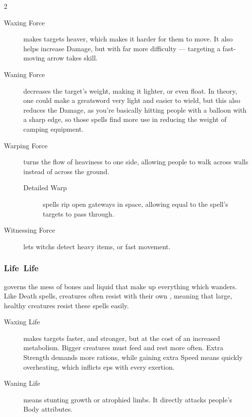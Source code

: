 \begin{multicols}{2}
\begin{description}
  \item[Waxing Force]
  makes targets heaver, which makes it harder for them to move.
  It also helps increase Damage, but with far more difficulty --- targeting a fast-moving arrow takes skill.

  \item[Waning Force]
  decreases the target's \gls{weight}, making it lighter, or even float.
  In theory, one could make a greatsword very light and easier to wield, but this also reduces the Damage, as you're basically hitting people with a balloon with a sharp edge, so those \glspl{spell} find more use in reducing the \gls{weight} of camping equipment.

  \item[Warping Force]
  turns the flow of heaviness to one side, allowing people to walk across walls instead of across the ground.

  \begin{description}
    \item[Detailed Warp]
    \glspl{spell} rip open gateways in space, allowing  equal to the \gls{spell}'s targets to pass through.
  \end{description}

  \item[Witnessing Force]
  lets \glspl{witch} detect heavy items, or fast movement.
\end{description}

\subsubsection[Life]{\gls{Life}~Life}
governs the mess of bones and liquid that make up everything which wanders.
Like Death \glspl{spell}, creatures often resist with their own , meaning that large, healthy creatures resist these \glspl{spell} easily.

\begin{description}
  \item[Waxing Life]
  makes targets faster, and stronger, but at the cost of an increased metabolism.
  Bigger creatures must feed and rest more often.
  Extra Strength demands more \glspl{ration}, while gaining extra Speed means quickly overheating, which inflicts \glspl{ep} with every exertion.

  \item[Waning Life]
  means stunting growth or atrophied limbs.
  It directly attacks people's Body \glspl{attribute}.


\end{description}
\end{multicols}
